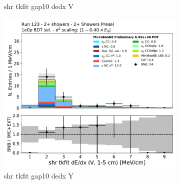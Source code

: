 \begin{figure}[H]
\begin{subfigure}{0.3\textwidth}
    \caption{shr tkfit gap10 dedx V}
    \end{subfigure}
    \begin{subfigure}{0.3\textwidth}
    \includegraphics[width=1.0\textwidth]{Sidebands/Figures/TwoShr_1e0pSel/BDT/shr_tkfit_gap10_dedx_V.pdf}
    \caption{shr tkfit gap10 dedx Y}
    \end{subfigure}
    \caption{} 
    \label{fig:HE_1eNp_1}
\end{figure}

